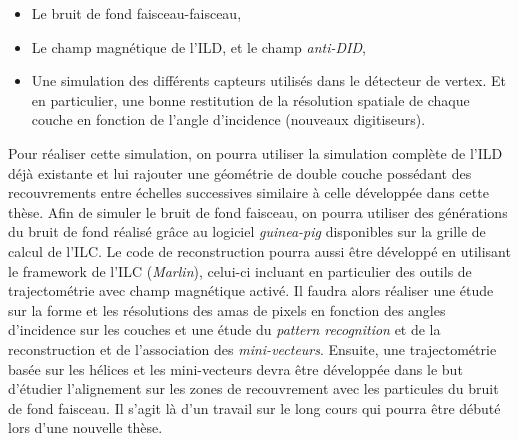   \medskip
  
  \renewcommand{\labelitemi}{$\bullet$}
  \begin{itemize}
   \item Le bruit de fond faisceau-faisceau,
   \item Le champ magn\'etique de l'ILD, et le champ \textit{anti-DID},
   \item Une simulation des diff\'erents capteurs utilis\'es dans le d\'etecteur de vertex. Et en particulier, une bonne restitution de la r\'esolution spatiale de chaque couche en fonction de l'angle d'incidence (nouveaux digitiseurs).
  \end{itemize}
  
  \medskip
  
  Pour r\'ealiser cette simulation, on pourra utiliser la simulation compl\`ete de l'ILD d\'ejà existante et lui rajouter une g\'eom\'etrie de double couche poss\'edant des recouvrements entre \'echelles successives similaire \`a celle d\'evelopp\'ee dans cette th\`ese. Afin de simuler le bruit de fond faisceau, on pourra utiliser des g\'en\'erations du bruit de fond r\'ealisé gr\^ace au logiciel \textit{guinea-pig} disponibles sur la grille de calcul de l'ILC. Le code de reconstruction pourra aussi \^etre d\'evelopp\'e en utilisant le framework de l'ILC (\textit{Marlin}), celui-ci incluant en particulier des outils de trajectom\'etrie avec champ magn\'etique activ\'e. Il faudra alors r\'ealiser une \'etude sur la forme et les r\'esolutions des amas de pixels en fonction des angles d'incidence sur les couches et une \'etude du \textit{pattern recognition} et de la reconstruction et de l'association des \textit{mini-vecteurs}. Ensuite, une trajectom\'etrie bas\'ee sur les h\'elices et les mini-vecteurs devra \^etre d\'evelopp\'ee dans le but d'\'etudier l'alignement sur les zones de recouvrement avec les particules du bruit de fond faisceau. Il s'agit l\`a d'un travail sur le long cours qui pourra \^etre d\'ebut\'e lors d'une nouvelle th\`ese.
  
  \medskip
  

